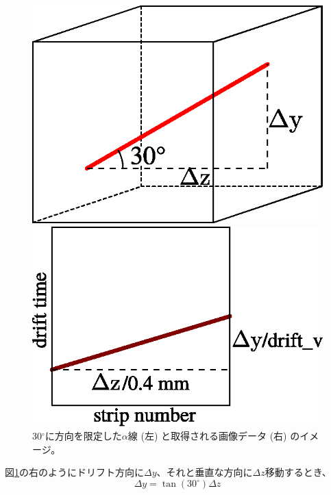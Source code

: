 \begin{figure}
  \centering
  \begin{minipage}{0.45\columnwidth}
    \centering
    \includegraphics[clip, width=0.9\columnwidth]{eps/drift_v_source.eps}
  \end{minipage}
  \begin{minipage}{0.45\columnwidth}
    \centering
    \includegraphics[clip, width=0.9\columnwidth]{eps/drift_v_image.eps}
  \end{minipage}
  \caption[30${}^{\circ}$に方向を限定した$\alpha$線と取得される画像データのイメージ。]
          {30${}^{\circ}$に方向を限定した$\alpha$線 (左) と取得される画像データ (右) のイメージ。}
  \label{fig::drift_v_image}
\end{figure}
図\ref{fig::drift_v_image}の右のようにドリフト方向に$\Delta y$、それと垂直な方向に$\Delta z$移動するとき、
\begin{equation}
  \Delta y = \tan(30^{\circ})\Delta z \label{eq::deltay_deltaz}
\end{equation}
